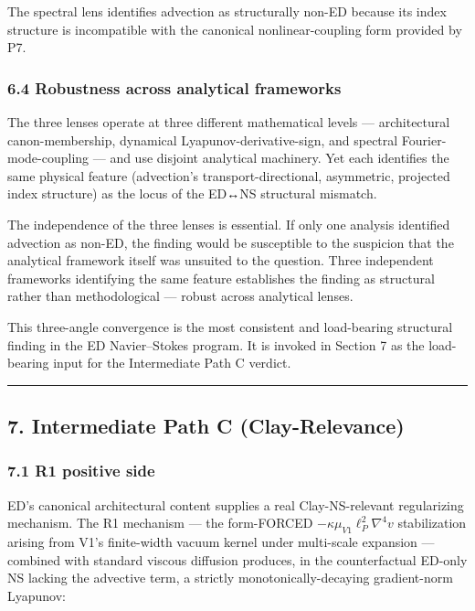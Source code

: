 \documentclass[
]{article}
\begin{document}
The spectral lens identifies advection as structurally non-ED because
its index structure is incompatible with the canonical
nonlinear-coupling form provided by P7.

\subsubsection{6.4 Robustness across analytical
frameworks}\label{robustness-across-analytical-frameworks}

The three lenses operate at three different mathematical levels ---
architectural canon-membership, dynamical Lyapunov-derivative-sign, and
spectral Fourier-mode-coupling --- and use disjoint analytical
machinery. Yet each identifies the same physical feature (advection's
transport-directional, asymmetric, projected index structure) as the
locus of the ED↔NS structural mismatch.

The independence of the three lenses is essential. If only one analysis
identified advection as non-ED, the finding would be susceptible to the
suspicion that the analytical framework itself was unsuited to the
question. Three independent frameworks identifying the same feature
establishes the finding as structural rather than methodological ---
robust across analytical lenses.

This three-angle convergence is the most consistent and load-bearing
structural finding in the ED Navier--Stokes program. It is invoked in
Section 7 as the load-bearing input for the Intermediate Path C verdict.

\begin{center}\rule{0.5\linewidth}{0.5pt}\end{center}

\subsection{7. Intermediate Path C
(Clay-Relevance)}\label{intermediate-path-c-clay-relevance}

\subsubsection{7.1 R1 positive side}\label{r1-positive-side}

ED's canonical architectural content supplies a real Clay-NS-relevant
regularizing mechanism. The R1 mechanism --- the form-FORCED
\(-\kappa\mu_{V1}\ell_P^2\nabla^4 v\) stabilization arising from V1's
finite-width vacuum kernel under multi-scale expansion --- combined with
standard viscous diffusion produces, in the counterfactual ED-only NS
lacking the advective term, a strictly monotonically-decaying
gradient-norm Lyapunov:
\end{document}
